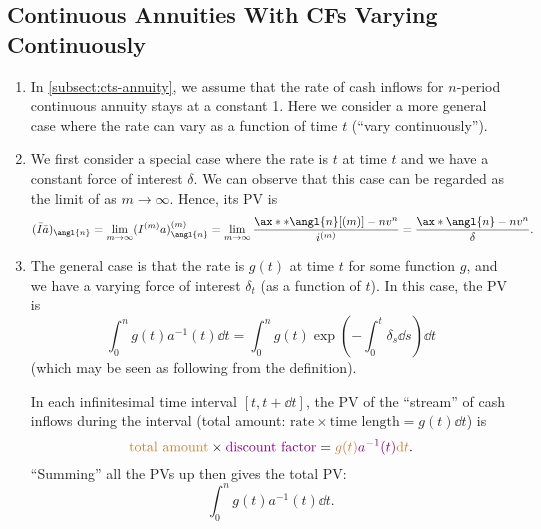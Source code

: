 \subsection{Continuous Annuities With CFs Varying Continuously}
\begin{enumerate}
\item In \cref{subsect:cts-annuity}, we assume that the rate of cash inflows
for \(n\)-period continuous annuity stays at a constant 1. Here we consider a
more general case where the rate can vary as a function of time \(t\) (``vary
continuously'').
\item We first consider a special case where the rate is \(t\) at time \(t\)
and we have a constant force of interest \(\delta\). We can observe that this
case can be regarded as the limit of  as
\(m\to\infty\). Hence, its PV is
\[
(\bar{I}\bar{a})_{\angl{n}}=\lim_{m\to \infty}(I^{(m)}a)_{\angl{n}}^{(m)}
=\lim_{m\to \infty}\frac{\ax**{\angl{n}}[(m)]-nv^n}{i^{(m)}}
=\frac{\ax*{\angl{n}}-nv^n}{\delta}.
\]
\item The general case is that the rate is \(g(t)\) at time \(t\) for some
function \(g\), and we have a varying force of interest \(\delta_t\) (as a
function of \(t\)). In this case, the PV is
\[
\int_{0}^{n}g(t)a^{-1}(t)\dd{t}
=\int_{0}^{n}g(t)\exp(-\int_{0}^{t}\delta_s\dd{s})\dd{t}
\]
(which may be seen as following from the definition).

\begin{intuition}
In each infinitesimal time interval \([t,t+\dd{t}]\), the PV of the ``stream''
of cash inflows during the interval (total amount: \(\text{rate}\times\text{time length}=g(t)\dd{t}\)) is
\[{\color{brown}\text{total amount}}\times{\color{violet}\text{discount factor}}
={\color{brown}g(t)}{\color{violet}a^{-1}(t)}{\color{brown}\dd{t}}.\]
``Summing'' all the PVs up then gives the total PV:
\[
\int_{0}^{n}g(t)a^{-1}(t)\dd{t}.
\]
\end{intuition}
\end{enumerate}

